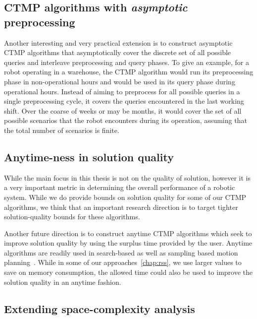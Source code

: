 \documentclass[a4paper]{report}
\begin{document}
\subsection{CTMP algorithms with \emph{asymptotic} preprocessing}
Another interesting and very practical extension is to construct asymptotic CTMP algorithms that asymptotically cover the discrete set of all possible queries and interleave preprocessing and query phases. To give an example, for a robot operating in a warehouse, the CTMP algorithm would run its preprocessing phase in non-operational hours and would be used in its query phase during operational hours. Instead of aiming to preprocess for all possible queries in a single preprocessing cycle, it covers the queries encountered in the last working shift. Over the coarse of weeks or may be months, it would cover the set of all possible scenarios that the robot encounters during its operation, assuming that the total number of scenarios is finite.

\subsection{Anytime-ness in solution quality}
While the main focus in this thesis is not on the quality of solution, however it is a very important metric in determining the overall performance of a robotic system. While we do provide bounds on solution quality for some of our CTMP algorithms, we think that an important research direction is to target tighter solution-quality bounds for these algorithms.

Another future direction is to construct anytime CTMP algorithms which seek to improve solution quality by using the surplus \Tbound time provided by the user. Anytime algorithms are readily used in search-based as well as sampling based motion planning~\cite{likhachev2004ara,karaman2011sampling}. While in some of our approaches~\ref{chap:rss}, we use larger \Tbound values to save on memory consumption, the allowed time could also be used to improve the solution quality in an anytime fashion.

\subsection{Extending space-complexity analysis}
\end{document}
